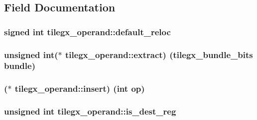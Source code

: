 \subsection{Field Documentation}
\subsubsection[{\texorpdfstring{default\+\_\+reloc}{default_reloc}}]{\setlength{\rightskip}{0pt plus 5cm}signed {\bf int} tilegx\+\_\+operand\+::default\+\_\+reloc}\hypertarget{structtilegx__operand_a960691baf2eaf779c1bc06fd69a31cc6}{}\label{structtilegx__operand_a960691baf2eaf779c1bc06fd69a31cc6}
\subsubsection[{\texorpdfstring{extract}{extract}}]{\setlength{\rightskip}{0pt plus 5cm}unsigned {\bf int}($\ast$ tilegx\+\_\+operand\+::extract) ({\bf tilegx\+\_\+bundle\+\_\+bits} bundle)}\hypertarget{structtilegx__operand_a766d8daeb988fde8b210faf67d342129}{}\label{structtilegx__operand_a766d8daeb988fde8b210faf67d342129}
\subsubsection[{\texorpdfstring{insert}{insert}}]{($\ast$ tilegx\+\_\+operand\+::insert) ({\bf int} op)}\hypertarget{structtilegx__operand_a3e71b6d7a3cd23a0d849ce23d10928cb}{}\label{structtilegx__operand_a3e71b6d7a3cd23a0d849ce23d10928cb}
\subsubsection[{\texorpdfstring{is\+\_\+dest\+\_\+reg}{is_dest_reg}}]{\setlength{\rightskip}{0pt plus 5cm}unsigned {\bf int} tilegx\+\_\+operand\+::is\+\_\+dest\+\_\+reg}\hypertarget{structtilegx__operand_a5de47e15ec0d47a5b792843725669286}{}\label{structtilegx__operand_a5de47e15ec0d47a5b792843725669286}
